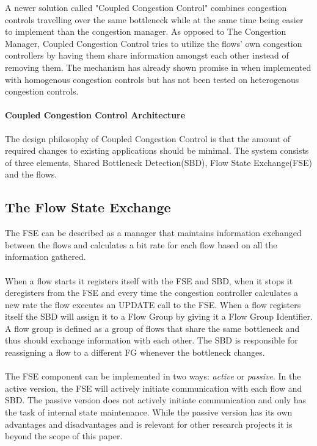 A newer solution called "Coupled Congestion Control" \cite{rfc8699} combines congestion controls travelling over the same bottleneck while at the same time being easier to implement than the congestion manager.
As opposed to The Congestion Manager, Coupled Congestion Control tries to utilize the flows' own congestion controllers by having them share information amongst each other instead of removing them. 
The mechanism has already shown promise in \cite{10.1145/2740070.2630089, 7502803} when implemented with homogenous congestion controls but has not been tested on heterogenous congestion controls. 

\paragraph{Coupled Congestion Control Architecture}
The design philosophy of Coupled Congestion Control is that the amount of required changes to existing applications should be minimal. 
The system consists of three elements, Shared Bottleneck Detection(SBD), Flow State Exchange(FSE) and the flows. 

\subsection{The Flow State Exchange}
The FSE can be described as a manager that maintains information exchanged between the flows and calculates a bit rate for each flow based on all the information gathered. 
\paragraph{}
When a flow starts it registers itself with the FSE and SBD, when it stops it deregisters from the FSE and every time the congestion controller calculates a new rate the flow executes an UPDATE call to the FSE.
When a flow registers itself the SBD will assign it to a Flow Group by giving it a Flow Group Identifier.
A flow group is defined as a group of flows that share the same bottleneck and thus should exchange information with each other. 
The SBD is responsible for reassigning a flow to a different FG whenever the bottleneck changes.
\paragraph{}
The FSE component can be implemented in two ways: \textit{active} or \textit{passive}.
In the active version, the FSE will actively initiate communication with each flow and SBD. 
The passive version does not actively initiate communication and only has the task of internal state maintenance.
While the passive version has its own advantages and disadvantages and is relevant for other research projects it is beyond the scope of this paper.

